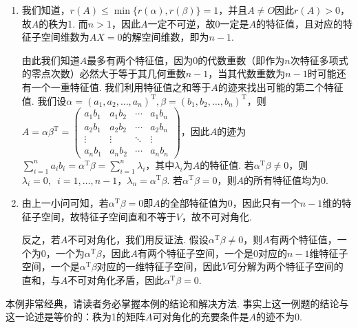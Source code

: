 \begin{solution}
    \begin{enumerate}
        \item 我们知道，$r(A)\leqslant\min{\{r(\alpha),r(\beta)\}}=1$，并且$A\neq O$因此$r(A)>0$，故$A$的秩为1. 而$n>1$，因此$A$一定不可逆，故0一定是$A$的特征值，且对应的特征子空间维数为$AX=0$的解空间维数，即为$n-1$.

              由此我们知道$A$最多有两个特征值，因为0的代数重数（即作为$n$次特征多项式的零点次数）必然大于等于其几何重数$n-1$，当其代数重数为$n-1$时可能还有一个一重特征值. 我们利用特征值之和等于$A$的迹来找出可能的第二个特征值. 我们设$\alpha=(a_1,a_2,\ldots,a_n)^\mathrm{T},\beta=(b_1,b_2,\ldots,b_n)^\mathrm{T}$，则$A=\alpha\beta^\mathrm{T}=\begin{pmatrix}
                      a_1b_1 & a_1b_2 & \cdots & a_1b_n \\
                      a_2b_1 & a_2b_2 & \cdots & a_2b_n \\
                      \vdots & \vdots & \ddots & \vdots \\
                      a_nb_1 & a_nb_2 & \cdots & a_nb_n
                  \end{pmatrix}$，因此$A$的迹为$\sum\limits_{i=1}^na_ib_i=\alpha^\mathrm{T}\beta=\sum\limits_{i=1}^n\lambda_i$，其中$\lambda_i$为$A$的特征值. 若$\alpha^\mathrm{T}\beta\neq 0$，则$\lambda_i=0,\enspace i=1,\ldots,n-1$，$\lambda_n=\alpha^\mathrm{T}\beta$. 若$\alpha^\mathrm{T}\beta=0$，则$A$的所有特征值均为0.

        \item 由上一小问可知，若$\alpha^\mathrm{T}\beta=0$即$A$的全部特征值为0，因此只有一个$n-1$维的特征子空间，故特征子空间直和不等于$V$，故不可对角化.

              反之，若$A$不可对角化，我们用反证法. 假设$\alpha^\mathrm{T}\beta\neq 0$，则$A$有两个特征值，一个为0，一个为$\alpha^\mathrm{T}\beta$，因此$A$有两个特征子空间，一个是0对应的$n-1$维特征子空间，一个是$\alpha^\mathrm{T}\beta$对应的一维特征子空间，因此$V$可分解为两个特征子空间的直和，与$A$不可对角化矛盾，因此$\alpha^\mathrm{T}\beta=0$.
    \end{enumerate}
\end{solution}

本例非常经典，请读者务必掌握本例的结论和解决方法. 事实上这一例题的结论与这一论述是等价的：秩为1的矩阵$A$可对角化的充要条件是$A$的迹不为0.

